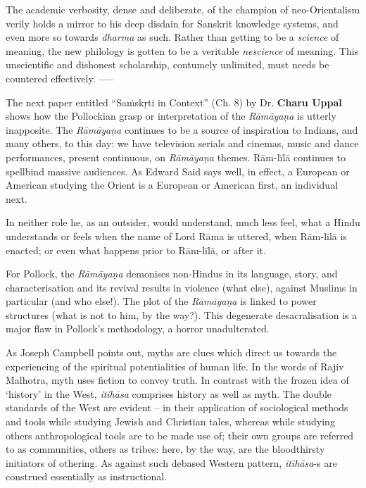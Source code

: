 The academic verbosity, dense and deliberate, of the champion of neo-Orientalism verily holds a mirror to his deep disdain for Sanskrit knowledge systems, and even more so towards \textit{dharma} as such. Rather than getting to be a \textit{science} of meaning, the new philology is gotten to be a veritable \textit{nescience} of meaning. This unscientific and dishonest scholarship, contumely unlimited, must needs be countered effectively. -----

The next paper entitled “Saṁskṛti in Context” (Ch. 8) by Dr. \textbf{Charu Uppal} shows how the Pollockian grasp or interpretation of the \textit{Rāmāyaṇa} is utterly inapposite. The \textit{Rāmāyaṇa} continues to be a source of inspiration to Indians, and many others, to this day: we have television serials and cinemas, music and dance performances, present continuous, on \textit{Rāmāyaṇa} themes. Rām-līlā continues to spellbind massive audiences. As Edward Said says well, in effect, a European or American studying the Orient is a European or American first, an individual next.

In neither role he, as an outsider, would understand, much less feel, what a Hindu understands or feels when the name of Lord Rāma is uttered, when Rām-līlā is enacted; or even what happens prior to Rām-līlā, or after it.

For Pollock, the \textit{Rāmāyaṇa} demonises non-Hindus in its language, story, and characterisation and its revival results in violence (what else), against Muslims in particular (and who else!). The plot of the \textit{Rāmāyaṇa} is linked to power structures (what is not to him, by the way?). This degenerate desacralisation is a major flaw in Pollock’s methodology, a horror unadulterated.

As Joseph Campbell points out, myths are clues which direct us towards the experiencing of the spiritual potentialities of human life. In the words of Rajiv Malhotra, myth uses fiction to convey truth. In contrast with the frozen idea of ‘history’ in the West, \textit{itihāsa} comprises history as well as myth. The double standards of the West are evident – in their application of sociological methods and tools while studying Jewish and Christian tales, whereas while studying others anthropological tools are to be made use of; their own groups are referred to as communities, others as tribes: here, by the way, are the bloodthirsty initiators of othering. As against such debased Western pattern, \textit{itihāsa}-s are construed essentially as instructional.

